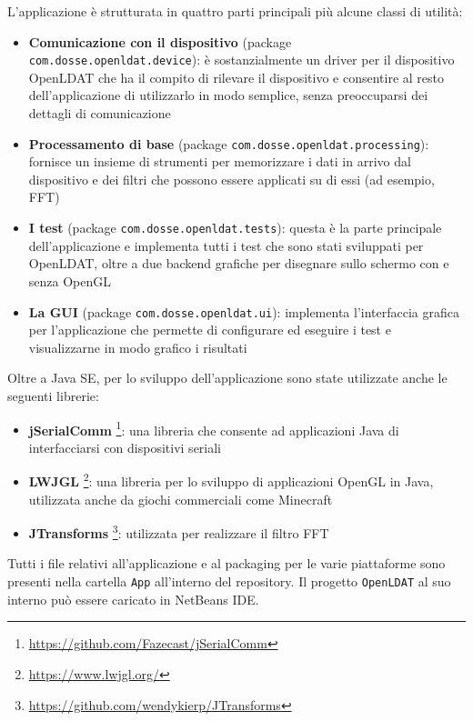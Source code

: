 L'applicazione è strutturata in quattro parti principali più alcune classi di utilità:
\begin{itemize}
	\item \textbf{Comunicazione con il dispositivo} (package \texttt{com.dosse.openldat.device}): è sostanzialmente un driver per il dispositivo OpenLDAT che ha il compito di rilevare il dispositivo e consentire al resto dell'applicazione di utilizzarlo in modo semplice, senza preoccuparsi dei dettagli di comunicazione
	\item \textbf{Processamento di base} (package \texttt{com.dosse.openldat.processing}): fornisce un insieme di strumenti per memorizzare i dati in arrivo dal dispositivo e dei filtri che possono essere applicati su di essi (ad esempio, FFT)
	\item \textbf{I test} (package \texttt{com.dosse.openldat.tests}): questa è la parte principale dell'applicazione e implementa tutti i test che sono stati sviluppati per OpenLDAT, oltre a due backend grafiche per disegnare sullo schermo con e senza OpenGL
	\item \textbf{La GUI} (package \texttt{com.dosse.openldat.ui}): implementa l'interfaccia grafica per l'applicazione che permette di configurare ed eseguire i test e visualizzarne in modo grafico i risultati
\end{itemize}

Oltre a Java SE, per lo sviluppo dell'applicazione sono state utilizzate anche le seguenti librerie:
\begin{itemize}
	\item \textbf{jSerialComm} \footnote{\href{https://github.com/Fazecast/jSerialComm}{https://github.com/Fazecast/jSerialComm}}: una libreria che consente ad applicazioni Java di interfacciarsi con dispositivi seriali
	\item \textbf{LWJGL} \footnote{\href{https://www.lwjgl.org/}{https://www.lwjgl.org/}}: una libreria per lo sviluppo di applicazioni OpenGL in Java, utilizzata anche da giochi commerciali come Minecraft
	\item \textbf{JTransforms} \footnote{\href{https://github.com/wendykierp/JTransforms}{https://github.com/wendykierp/JTransforms}}: utilizzata per realizzare il filtro FFT
\end{itemize}

Tutti i file relativi all'applicazione e al packaging per le varie piattaforme sono presenti nella cartella \texttt{App} all'interno del repository. Il progetto \texttt{OpenLDAT} al suo interno può essere caricato in NetBeans IDE.

